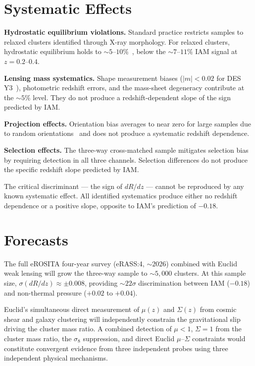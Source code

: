 \documentclass[12pt,a4paper]{article}
\begin{document}
\section{Systematic Effects}

\textbf{Hydrostatic equilibrium violations.} Standard practice restricts samples
to relaxed clusters identified through X-ray morphology. For relaxed clusters,
hydrostatic equilibrium holds to $\sim 5$--$10\%$~\citep{Neto2007,Planelles2017},
below the $\sim 7$--$11\%$ IAM signal at $z = 0.2$--$0.4$.

\textbf{Lensing mass systematics.} Shape measurement biases ($|m| < 0.02$ for
DES Y3~\citep{MacCrann2022}), photometric redshift errors, and the mass-sheet
degeneracy contribute at the $\sim 5\%$ level. They do not produce a
redshift-dependent slope of the sign predicted by IAM.

\textbf{Projection effects.} Orientation bias averages to near zero for large
samples due to random orientations~\citep{Corless2008} and does not produce
a systematic redshift dependence.

\textbf{Selection effects.} The three-way cross-matched sample mitigates selection
bias by requiring detection in all three channels. Selection differences do not
produce the specific redshift slope predicted by IAM.

The critical discriminant --- the sign of $dR/dz$ --- cannot be reproduced by
any known systematic effect. All identified systematics produce either no redshift
dependence or a positive slope, opposite to IAM's prediction of $-0.18$.

\section{Forecasts}

The full eROSITA four-year survey (eRASS:4, $\sim 2026$) combined with Euclid
weak lensing will grow the three-way sample to $\sim 5{,}000$ clusters. At this
sample size, $\sigma(dR/dz) \approx \pm 0.008$, providing $\sim 22\sigma$
discrimination between IAM ($-0.18$) and non-thermal pressure ($+0.02$ to $+0.04$).

Euclid's simultaneous direct measurement of $\mu(z)$ and $\Sigma(z)$ from cosmic
shear and galaxy clustering will independently constrain the gravitational slip
driving the cluster mass ratio. A combined detection of $\mu < 1$, $\Sigma = 1$
from the cluster mass ratio, the $\sigma_8$ suppression, and direct Euclid
$\mu$--$\Sigma$ constraints would constitute convergent evidence from three
independent probes using three independent physical mechanisms.
\end{document}
